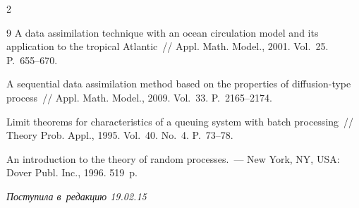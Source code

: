 \begin{multicols}{2}
{{\begin{thebibliography}{9}
  A data assimilation technique with an ocean circulation model and its application to the tropical Atlantic~// Appl. Math. Model., 2001. Vol.~25. P.~655--670.




 A sequential data assimilation method based on the properties of diffusion-type process~// Appl. Math. Model., 2009.  Vol.~33. P.~2165--2174.




 Limit theorems for characteristics of a queuing system with batch processing~// Theory Prob. Appl., 1995.  Vol.~40. No.~4. P.~73--78.




 An introduction to the theory of random processes.~--- New York, NY, USA: Dover Publ. Inc., 1996. 519~p.

 \end{thebibliography}



 }

 }



\end{multicols}



\vspace*{-3pt}



\hfill{\small\textit{Поступила в~редакцию 19.02.15}}



\newpage















\vspace*{-24pt}



\def\tit{ON A LIMIT DISTRIBUTION OF CHARACTERISTICS IN STATIONARY REGIME FOR THE LINEAR ASSIMILATION PROBLEM}



